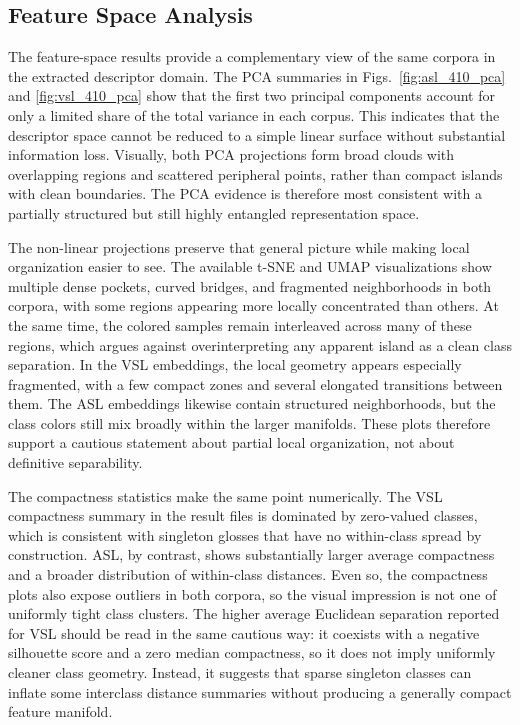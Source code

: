 \documentclass{ieeeaccess}
\begin{document}
\subsection{Feature Space Analysis}
The feature-space results provide a complementary view of the same corpora in the extracted descriptor domain. The PCA summaries in Figs.~\ref{fig:asl_410_pca} and \ref{fig:vsl_410_pca} show that the first two principal components account for only a limited share of the total variance in each corpus. This indicates that the descriptor space cannot be reduced to a simple linear surface without substantial information loss. Visually, both PCA projections form broad clouds with overlapping regions and scattered peripheral points, rather than compact islands with clean boundaries. The PCA evidence is therefore most consistent with a partially structured but still highly entangled representation space.

The non-linear projections preserve that general picture while making local organization easier to see. The available t-SNE and UMAP visualizations show multiple dense pockets, curved bridges, and fragmented neighborhoods in both corpora, with some regions appearing more locally concentrated than others. At the same time, the colored samples remain interleaved across many of these regions, which argues against overinterpreting any apparent island as a clean class separation. In the VSL embeddings, the local geometry appears especially fragmented, with a few compact zones and several elongated transitions between them. The ASL embeddings likewise contain structured neighborhoods, but the class colors still mix broadly within the larger manifolds. These plots therefore support a cautious statement about partial local organization, not about definitive separability.

The compactness statistics make the same point numerically. The VSL compactness summary in the result files is dominated by zero-valued classes, which is consistent with singleton glosses that have no within-class spread by construction. ASL, by contrast, shows substantially larger average compactness and a broader distribution of within-class distances. Even so, the compactness plots also expose outliers in both corpora, so the visual impression is not one of uniformly tight class clusters. The higher average Euclidean separation reported for VSL should be read in the same cautious way: it coexists with a negative silhouette score and a zero median compactness, so it does not imply uniformly cleaner class geometry. Instead, it suggests that sparse singleton classes can inflate some interclass distance summaries without producing a generally compact feature manifold.
\end{document}
